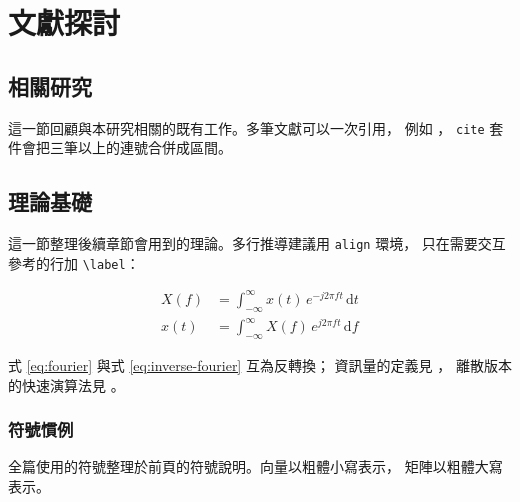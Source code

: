 
\chapter{文獻探討}
\label{ch:background}

\section{相關研究}
\label{sec:related-work}

這一節回顧與本研究相關的既有工作。多筆文獻可以一次引用，
例如 \cite{knuth1984texbook, mittelbach2004companion, shannon1948mathematical}，
\verb|cite| 套件會把三筆以上的連號合併成區間。

\section{理論基礎}
\label{sec:theory}

這一節整理後續章節會用到的理論。多行推導建議用 \verb|align| 環境，
只在需要交互參考的行加 \verb|\label|：

\begin{align}
  X(f) &= \int_{-\infty}^{\infty} x(t)\, e^{-j 2\pi f t}\, \mathrm{d}t
  \label{eq:fourier} \\
  x(t) &= \int_{-\infty}^{\infty} X(f)\, e^{ j 2\pi f t}\, \mathrm{d}f
  \label{eq:inverse-fourier}
\end{align}

式 \eqref{eq:fourier} 與式 \eqref{eq:inverse-fourier} 互為反轉換；
資訊量的定義見 \cite{shannon1948mathematical}，
離散版本的快速演算法見 \cite{cooley1965algorithm}。

\subsection{符號慣例}
\label{subsec:notation}

全篇使用的符號整理於前頁的符號說明。向量以粗體小寫表示，
矩陣以粗體大寫表示。
